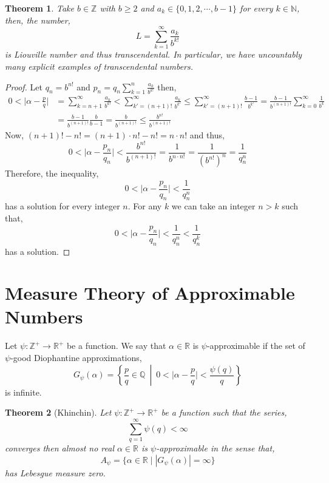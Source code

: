 \documentclass{article}
\newcommand{\Z}{\mathbb{Z}}
\newcommand{\N}{\mathbb{N}}
\newcommand{\Zplus}{\mathbb{Z}^{+}}
\newcommand{\Q}{\mathbb{Q}}
\newcommand{\R}{\mathbb{R}}
\newcommand{\Rplus}{\mathbb{R}^+}
\newenvironment{definition}[1][Definition:]{\begin{trivlist}
\item[\hskip \labelsep {\bfseries #1}]}{\end{trivlist}}
\theoremstyle{theorem}
\newtheorem{theorem}{Theorem}[section]
\theoremstyle{definition}
\theoremstyle{definition}
\theoremstyle{remark}
\theoremstyle{definition}
\theoremstyle{remark}
\begin{document}
\begin{theorem}
Take $b \in \Z$ with $b \ge 2$ and $a_k \in \{0, 1, 2, \cdots, b - 1\}$ for every $k \in \N$, then, the number,
\[L = \sum_{k = 1}^\infty \frac{a_k}{b^{k!}}\] is Liouville number and thus transcendental. In particular, we have uncountably many explicit examples of transcendental numbers. 
\end{theorem}

\begin{proof}
Let $q_n = b^{n!}$ and $p_n = q_n \sum\limits_{k = 1}^n \frac{a_k}{b^{k!}}$ then,
\begin{align*}
0 < \Big| \alpha - \frac{p}{q} \Big| & = \sum_{k = n + 1}^\infty \frac{a_k}{b^{k!}} <   \sum_{k' = (n + 1)!}^\infty \frac{a_k}{b^{k'}} \le \sum_{k' = (n + 1)!}^\infty \frac{b-1}{b^{k'}} = \frac{b - 1}{b^{(n+1)!}} \sum_{k = 0}^\infty \frac{1}{b^{k}} \\ & = \frac{b - 1}{b^{(n+1)!}} \frac{b}{b-1} = \frac{b}{b^{(n+1)!}} \le \frac{b^{n!}}{b^{(n+1)!}}
\end{align*}
Now, $(n+1)! - n! = (n+1) \cdot n! - n! = n \cdot n!$ and thus,
\[ 0 < \Big| \alpha - \frac{p_n}{q_n} \Big| < \frac{b^{n!}}{b^{(n+1)!}} = \frac{1}{b^{n \cdot n!}} = \frac{1}{(b^{n!})^n} = \frac{1}{q_n^n}\]
Therefore, the inequality,
\[0 < \Big| \alpha - \frac{p_n}{q_n} \Big| < \frac{1}{q_n^n}\]
has a solution for every integer $n$. For any $k$ we can take an integer $n > k$ such that,
\[0 < \Big| \alpha - \frac{p_n}{q_n} \Big| < \frac{1}{q_n^n} < \frac{1}{q_n^k}\]
has a solution.  
\end{proof}


\section{Measure Theory of Approximable Numbers}

\begin{definition}
Let $\psi : \Zplus \to \Rplus$ be a function. We say that $\alpha \in \R$ is $\psi$-approximable if the set of $\psi$-good Diophantine approximations,
\[ G_\psi(\alpha) = \left\{ \frac{p}{q} \in \Q \: \middle| \: 0 < \Big|\alpha - \frac{p}{q} \Big| < \frac{\psi(q)}{q} \right\} \]
is infinite. 
\end{definition}

\begin{theorem}[Khinchin]
Let $\psi : \Zplus \to \Rplus$ be a function such that the series,
\[ \sum_{q = 1}^\infty \psi(q) < \infty \]
converges then almost no real $\alpha \in \R$ is $\psi$-approximable in the sense that,
\[ A_\psi = \{ \alpha \in \R \mid |G_\psi(\alpha)| = \infty \} \]
has Lebesgue measure zero. 
\end{theorem}
\end{document}
